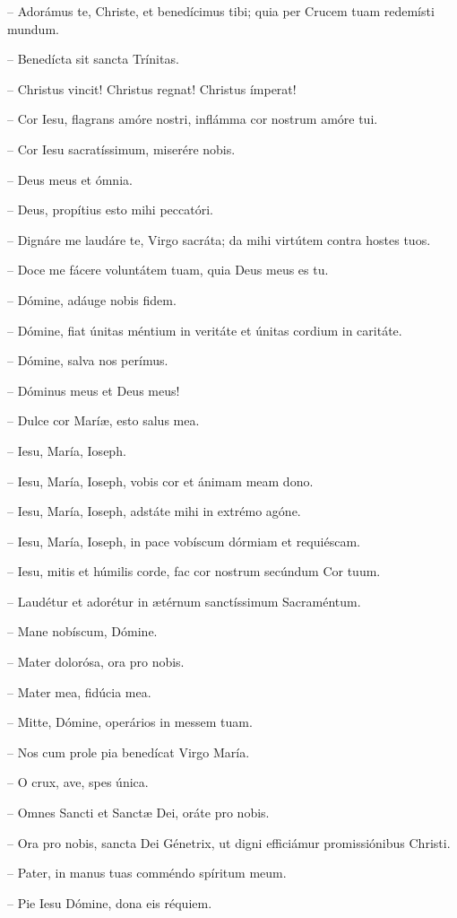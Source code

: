 \documentclass[12pt,a6paper]{book}
\begin{document}
\begin{sloppy}
– Adorámus te, Christe, et benedícimus tibi; quia per Crucem tuam redemísti mundum. 

– Benedícta sit sancta Trínitas. 

– Christus vincit! Christus regnat! Christus ímperat! 

– Cor Iesu, flagrans amóre nostri, inflámma cor nostrum amóre tui. 

– Cor Iesu sacratíssimum, miserére nobis. 

– Deus meus et ómnia. 

– Deus, propítius esto mihi peccatóri.

– Dignáre me laudáre te, Virgo sacráta; da mihi virtútem contra hostes tuos.

– Doce me fácere voluntátem tuam, quia Deus meus es tu.

– Dómine, adáuge nobis fidem.

– Dómine, fiat únitas méntium in veritáte et únitas cordium in caritáte. 

– Dómine, salva nos perímus.

– Dóminus meus et Deus meus!

– Dulce cor Maríæ, esto salus mea. 

– Iesu, María, Ioseph. 

– Iesu, María, Ioseph, vobis cor et ánimam meam dono. 

– Iesu, María, Ioseph, adstáte mihi in extrémo agóne. 

– Iesu, María, Ioseph, in pace vobíscum dórmiam et requiéscam. 

– Iesu, mitis et húmilis corde, fac cor nostrum secúndum Cor tuum. 

– Laudétur et adorétur in ætérnum sanctíssimum Sacraméntum. 

– Mane nobíscum, Dómine.

– Mater dolorósa, ora pro nobis.

– Mater mea, fidúcia mea. 

– Mitte, Dómine, operários in messem tuam.

– Nos cum prole pia benedícat Virgo María. 

– O crux, ave, spes única. 

– Omnes Sancti et Sanctæ Dei, oráte pro nobis. 

– Ora pro nobis, sancta Dei Génetrix, ut digni efficiámur promissiónibus Christi. 

– Pater, in manus tuas comméndo spíritum meum. 

– Pie Iesu Dómine, dona eis réquiem. 


\end{sloppy}
\end{document}
